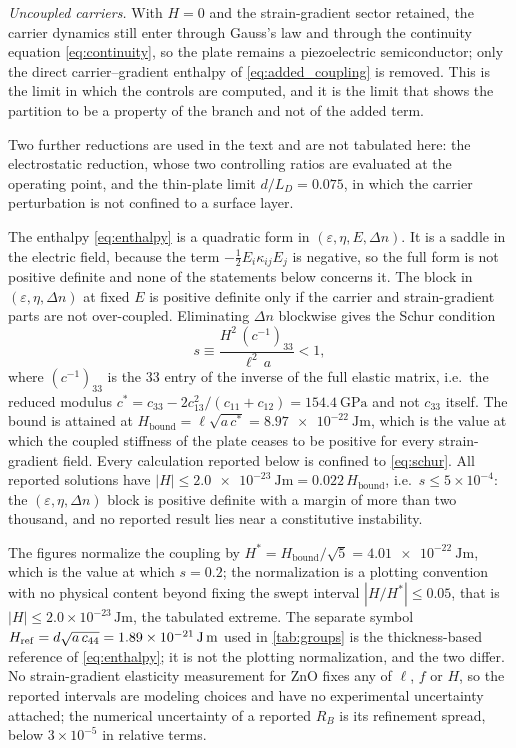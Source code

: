 \emph{Uncoupled carriers.}  With $H=0$ and the strain-gradient sector retained,
the carrier dynamics still enter through Gauss's law and through the continuity
equation \eqref{eq:continuity}, so the plate remains a piezoelectric
semiconductor; only the direct carrier--gradient enthalpy of
\eqref{eq:added_coupling} is removed.  This is the limit in which the controls are computed, and it is the limit that shows the
partition to be a property of the branch and not of the added term.

Two further reductions are used in the text and are not tabulated here: the
electrostatic reduction, whose two controlling
ratios are evaluated at the operating point, and the thin-plate limit
$d/L_D=0.075$, in which the carrier perturbation is not confined to a surface
layer.


The enthalpy \eqref{eq:enthalpy} is a quadratic form in
$(\varepsilon,\eta,E,\Delta n)$.  It is a saddle in the electric field, because the
term $-\tfrac12E_i\kappa_{ij}E_j$ is negative, so the full form is not positive definite and
none of the statements below concerns it.  The block in $(\varepsilon,\eta,\Delta n)$ at
fixed $E$ is positive definite only if the carrier and strain-gradient parts are not over-coupled.  Eliminating $\Delta n$ blockwise
gives the Schur condition
\begin{equation}
\label{eq:schur}
s\equiv\frac{H^2\,(c^{-1})_{33}}{\ell^2\,a}<1 ,
\end{equation}
where $(c^{-1})_{33}$ is the $33$ entry of the inverse of the full elastic
matrix, i.e.\ the reduced modulus
$c^{*}=c_{33}-2c_{13}^2/(c_{11}+c_{12})=\SI{154.4}{\giga\pascal}$ and not $c_{33}$
itself.  The bound is attained at
$H_{\text{bound}}=\ell\sqrt{a\,c^{*}}=\SI{8.97e-22}{\joule\metre}$, which is the
value at which the coupled stiffness of the plate ceases to be positive for
every strain-gradient field.  Every calculation reported below is confined to \eqref{eq:schur}.  All reported solutions have
$|H|\le\SI{2.0e-23}{\joule\metre}=0.022\,H_{\text{bound}}$, i.e.\ $s\le
5\times10^{-4}$: the $(\varepsilon,\eta,\Delta n)$ block is positive definite with a margin of more than two
thousand, and no reported result lies near a constitutive instability.

The figures normalize the coupling by
$H^{*}=H_{\text{bound}}/\sqrt5=\SI{4.01e-22}{\joule\metre}$, which is the value
at which $s=0.2$; the normalization is a plotting convention with no physical
content beyond fixing the swept interval $|H/H^{*}|\le0.05$, that is
$|H|\le2.0\times10^{-23}\,\si{\joule\metre}$, the tabulated extreme.  The
separate symbol $H_{\mathrm{ref}}=d\sqrt{a\,c_{44}}=\SI{1.89e-21}{%
\joule\metre}$ used in \cref{tab:groups} is the thickness-based
reference of \eqref{eq:enthalpy}; it is not the plotting normalization, and the two differ.  No strain-gradient elasticity measurement for
ZnO fixes any of $\ell$, $f$ or $H$, so the reported intervals are modeling
choices and have no experimental uncertainty attached; the numerical uncertainty of a
reported $R_B$ is its refinement spread, below $3\times10^{-5}$ in relative terms.
